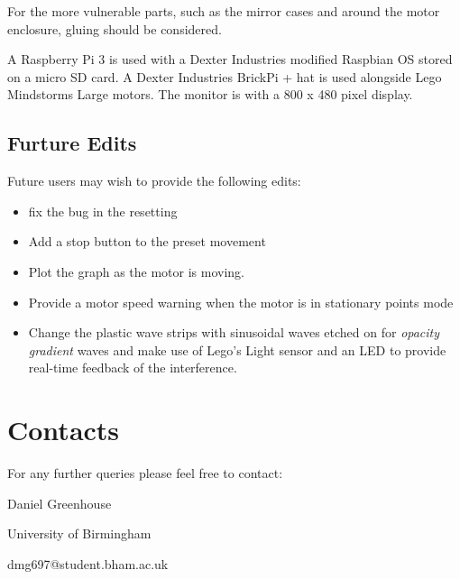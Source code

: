 \documentclass[a4paper, 12pt]{book}
\begin{document}
For the more vulnerable parts, such as the mirror cases and around the motor enclosure, gluing should be considered.

A Raspberry Pi 3 is used with a Dexter Industries modified Raspbian OS stored on a micro SD card. A Dexter Industries BrickPi + hat is used alongside Lego Mindstorms Large motors. The monitor is  with a 800 x 480 pixel display.

\section{Furture Edits}
\label{Future Edits}
Future users may wish to provide the following edits:
\begin{itemize}
\item fix the bug in the resetting
\item Add a stop button to the preset movement
\item Plot the graph as the motor is moving.
\item Provide a motor speed warning when the motor is in stationary points mode
\item Change the plastic wave strips with sinusoidal waves etched on for \textit{opacity gradient} waves and make use of Lego's Light sensor and an LED to provide real-time feedback of the interference.
\end{itemize}


\chapter{Contacts}
For any further queries please feel free to contact:

Daniel Greenhouse

University of Birmingham

dmg697@student.bham.ac.uk
\end{document}
